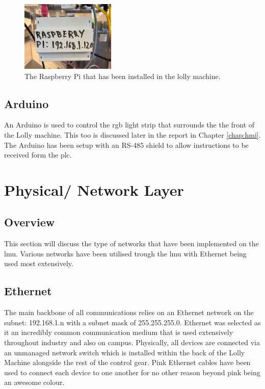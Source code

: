         \begin{figure}[H]
            \centering
            \includegraphics[width = 0.4\textwidth]{2_images/raspPiInstall}
            \caption{The Raspberry Pi that has been installed in the lolly machine.}
            \label{fig:raspPiInstall}
        \end{figure}
    
    
    \subsection{Arduino}
    An Arduino is used to control the \acrshort{rgb} light strip that surrounds the the front of the Lolly machine. This too is discussed later in the report in Chapter \ref{chap:hmi}. The Arduino has been setup with an RS-485 shield to allow instructions to be received form the \acrshort{plc}.
    
    \section{Physical/ Network Layer}
    
    \subsection{Overview}
    This section will discuss the type of networks that have been implemented on the \acrshort{lmu}. Various networks have been utilised trough the \acrshort{lmu} with Ethernet being used most extensively.
    
    \subsection{Ethernet} 
    The main backbone of all communications relies on an Ethernet network on the subnet: 192.168.1.n with a subnet mask of 255.255.255.0. Ethernet was selected as it an incredibly common communication medium that is used extensively throughout industry and also on campus. Physically, all devices are connected via an unmanaged network switch which is installed within the back of the Lolly Machine alongside the rest of the control gear. Pink Ethernet cables have been used to connect each device to one another for no other reason beyond pink being an awesome colour.
    
